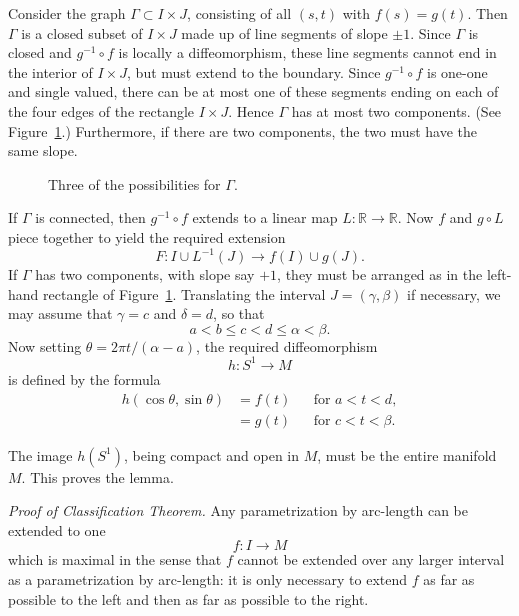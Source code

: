 Consider the graph $\Gamma \subset I \times J$, consisting of all $(s, t)$ with $f(s) = g(t)$. Then $\Gamma$ is a closed subset of $I \times J$ made up of line segments of slope $\pm 1$. Since $\Gamma$ is closed and $g^{-1} \circ f$ is locally a diffeomorphism, these line segments cannot end in the interior of $I \times J$, but must extend to the boundary. Since $g^{-1} \circ f$ is one-one and single valued, there can be at most one of these segments ending on each of the four edges of the rectangle $I \times J$. Hence $\Gamma$ has at most two components. (See Figure~\ref{fig:milnor-19}.) Furthermore, if there are two components, the two must have the same slope.

\begin{figure}[htbp]
\centering
\setcounter{figure}{18}%
\caption{Three of the possibilities for $\Gamma$.}\label{fig:milnor-19}
\end{figure}

If $\Gamma$ is connected, then $g^{-1} \circ f$ extends to a linear map $L : \mathbb{R} \to \mathbb{R}$. Now $f$ and $g \circ L$ piece together to yield the required extension
\[
F : I \cup L^{-1}(J) \to f(I) \cup g(J).
\]
If $\Gamma$ has two components, with slope say $+1$, they must be arranged as in the left-hand rectangle of Figure~\ref{fig:milnor-19}. Translating the interval $J = (\gamma, \beta)$ if necessary, we may assume that $\gamma = c$ and $\delta = d$, so that
\[
a < b \le c < d \le \alpha < \beta.
\]
Now setting $\theta = 2\pi t / (\alpha - a)$, the required diffeomorphism
\[
h : S^1 \to M
\]
is defined by the formula
\[
\begin{aligned}
h(\cos \theta, \sin \theta) &= f(t) && \text{for } a < t < d, \\
&= g(t) && \text{for } c < t < \beta.
\end{aligned}
\]



The image $h(S^1)$, being compact and open in $M$, must be the entire manifold $M$. This proves the lemma.

\noindent\textit{Proof of Classification Theorem.}
Any parametrization by arc-length can be extended to one
\[
f : I \to M
\]
which is maximal in the sense that $f$ cannot be extended over any larger interval as a parametrization by arc-length: it is only necessary to extend $f$ as far as possible to the left and then as far as possible to the right.

